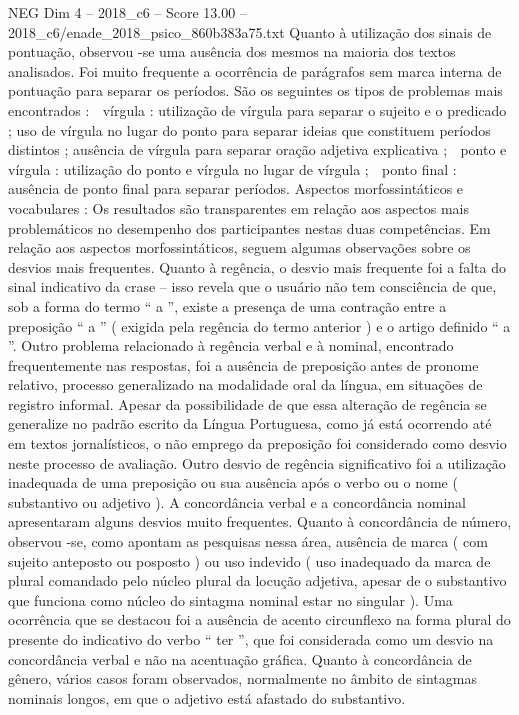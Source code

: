 \begin{textsample}{NEG Dim 4 – 2018\_c6 – Score 13.00 – 2018\_c6/enade\_2018\_psico\_860b383a75.txt}
Quanto à utilização dos sinais de pontuação, observou -se uma ausência dos mesmos na maioria dos textos analisados.
Foi muito frequente a ocorrência de parágrafos sem marca interna de pontuação para separar os períodos.
São os seguintes os tipos de problemas mais encontrados :  vírgula : utilização de vírgula para separar o sujeito e o predicado ; uso de vírgula no lugar do ponto para separar ideias que constituem períodos distintos ; ausência de vírgula para separar oração adjetiva explicativa ;  ponto e vírgula : utilização do ponto e vírgula no lugar de vírgula ;  ponto final : ausência de ponto final para separar períodos.
Aspectos morfossintáticos e vocabulares : Os resultados são transparentes em relação aos aspectos mais problemáticos no desempenho dos participantes nestas duas competências.
Em relação aos aspectos morfossintáticos, seguem algumas observações sobre os desvios mais frequentes.
Quanto à regência, o desvio mais frequente foi a falta do sinal indicativo da crase – isso revela que o usuário não tem consciência de que, sob a forma do termo “ a ”, existe a presença de uma contração entre a preposição “ a ” ( exigida pela regência do termo anterior ) e o artigo definido “ a ”.
Outro problema relacionado à regência verbal e à nominal, encontrado frequentemente nas respostas, foi a ausência de preposição antes de pronome relativo, processo generalizado na modalidade oral da língua, em situações de registro informal.
Apesar da possibilidade de que essa alteração de regência se generalize no padrão escrito da Língua Portuguesa, como já está ocorrendo até em textos jornalísticos, o não emprego da preposição foi considerado como desvio neste processo de avaliação.
Outro desvio de regência significativo foi a utilização inadequada de uma preposição ou sua ausência após o verbo ou o nome ( substantivo ou adjetivo ).
A concordância verbal e a concordância nominal apresentaram alguns desvios muito frequentes.
Quanto à concordância de número, observou -se, como apontam as pesquisas nessa área, ausência de marca ( com sujeito anteposto ou posposto ) ou uso indevido ( uso inadequado da marca de plural comandado pelo núcleo plural da locução adjetiva, apesar de o substantivo que funciona como núcleo do sintagma nominal estar no singular ).
Uma ocorrência que se destacou foi a ausência de acento circunflexo na forma plural do presente do indicativo do verbo “ ter ”, que foi considerada como um desvio na concordância verbal e não na acentuação gráfica.
Quanto à concordância de gênero, vários casos foram observados, normalmente no âmbito de sintagmas nominais longos, em que o adjetivo está afastado do substantivo.

\end{textsample}
